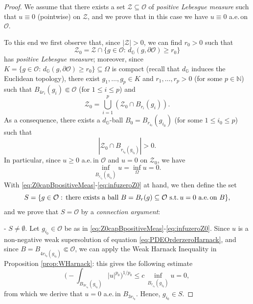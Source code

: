 \documentclass[10pt,a4paper]{amsart}
\begin{document}
\begin{proof} 
 We assume that there exists a set $\mathcal{Z}\subseteq\mathcal{O}$ of \emph{positive Lebesgue measure} such that $u \equiv 0$ (pointwise) on $\mathcal{Z}$, and we prove that in this case we have $u\equiv 0$ a.e.\,on $
\mathcal{O}$.
\vspace{0.1cm}

To this end we first observe that, since $|\mathcal{Z}| > 0$, we can find $r_0 > 0$ such that
$$\mathcal{Z}_0 = \mathcal{Z}\cap \{g\in\mathcal{O}:\,d_\mathbb{G}(g,\partial\mathcal{O}) \geq r_0\}$$
 has \emph{positive Lebesgue measure}; moreover, since $K = \{g\in\mathcal{O}:\,d_\mathbb{G}(g,\partial\mathcal{O}) \geq r_0\}\subseteq\Omega$
 is  com\-pact (recall that $d_\mathbb{G}$ induces 
 the Euclidean topology), there exist $g_1,\ldots,g_p\in K$ and $r_1,\ldots,r_p > 0$ (for some $p\in\mathbb{N}$) such that $B_{4r_i}(g_i)\Subset\mathcal{O}$ (for $1\leq i\leq p$) and
 $$\mathcal{Z}_0 = \bigcup_{i = 1}^p (\mathcal{Z}_0\cap B_{r_i}(g_i)).$$
 As a consequence, there exists a $d_\mathbb{G}$-ball $B_0 = B_{r_{i_0}}(g_{i_0})$
 (for some $1\leq i_0\leq p$) such that
 \begin{equation} \label{eq:Z0capBpositiveMeas}
  |\mathcal{Z}_0\cap B_{r_{i_0}(g_{i_0})}| > 0.
 \end{equation}	
 In particular, since $u\geq 0$ a.e.\,in $\mathcal{O}$ and $u = 0$ on $\mathcal{Z}_0$, we have
 \begin{equation} \label{eq:infuzeroZ0}
 	\inf_{B_{r_{i_0}}(g_{i_0})} u = \inf_{\Omega}u = 0.
 \end{equation}
 With \eqref{eq:Z0capBpositiveMeas}-\eqref{eq:infuzeroZ0}
at hand, we then define the set
 $$S = \{g\in\mathcal{O}:\,\text{there exists a ball 
 $B = B_r(g)\subseteq\mathcal{O}$ 
 s.t.\,$u = 0$ a.e.\,on $B$}\},$$
 and we prove that $S = \mathcal{O}$ by a \emph{connection argument}:
  \vspace{0.1cm}
 
 -\,\,\emph{$S\neq\emptyset$}. Let $g_{i_0}\in\mathcal{O}$ be as in \eqref{eq:Z0capBpositiveMeas}-\eqref{eq:infuzeroZ0}. Since $u$ is a non-negative weak supersolution of equation \eqref{eq:PDEOrderzeroHarnack}, and since
 $B = B_{4r_{i_0}(g_{i_0})}\Subset\mathcal{O}$, we can apply the Weak Harnack Inequality in Proposition \ref{prop:WHarnack}: this gives the following estimate
 $$\Big(-\!\!\!\!\!\!\!\int_{B_{3r_{i_0}}(g_{i_0})}|u|^{p_0}\Big)^{1/p_0}\leq c\,\inf_{B_{r_{i_0}}(g_{i_0})}u = 0,
$$
from which we derive that $u = 0$ a.e.\,in $B_{3r_{i_0}}$. Hence, $g_{i_0}\in S$.
 \medskip
 

\end{proof}
\end{document}
